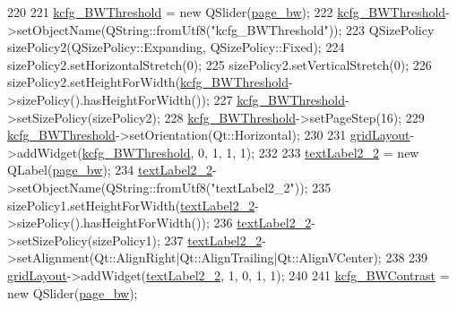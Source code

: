 \begin{DoxyCode}
220 
221         \hyperlink{classUi__DlgAccessibilityBase_a7be84a94ca25ab0c8bf269ef4fd69294}{kcfg\_BWThreshold} = \textcolor{keyword}{new} QSlider(\hyperlink{classUi__DlgAccessibilityBase_ad6248c8c27f576cedc9e49b6144c4bc4}{page\_bw});
222         \hyperlink{classUi__DlgAccessibilityBase_a7be84a94ca25ab0c8bf269ef4fd69294}{kcfg\_BWThreshold}->setObjectName(QString::fromUtf8(\textcolor{stringliteral}{"kcfg\_BWThreshold"}));
223         QSizePolicy sizePolicy2(QSizePolicy::Expanding, QSizePolicy::Fixed);
224         sizePolicy2.setHorizontalStretch(0);
225         sizePolicy2.setVerticalStretch(0);
226         sizePolicy2.setHeightForWidth(\hyperlink{classUi__DlgAccessibilityBase_a7be84a94ca25ab0c8bf269ef4fd69294}{kcfg\_BWThreshold}->sizePolicy().hasHeightForWidth());
227         \hyperlink{classUi__DlgAccessibilityBase_a7be84a94ca25ab0c8bf269ef4fd69294}{kcfg\_BWThreshold}->setSizePolicy(sizePolicy2);
228         \hyperlink{classUi__DlgAccessibilityBase_a7be84a94ca25ab0c8bf269ef4fd69294}{kcfg\_BWThreshold}->setPageStep(16);
229         \hyperlink{classUi__DlgAccessibilityBase_a7be84a94ca25ab0c8bf269ef4fd69294}{kcfg\_BWThreshold}->setOrientation(Qt::Horizontal);
230 
231         \hyperlink{classUi__DlgAccessibilityBase_a5f8944bbf69c844201c6fbfc3436c89b}{gridLayout}->addWidget(\hyperlink{classUi__DlgAccessibilityBase_a7be84a94ca25ab0c8bf269ef4fd69294}{kcfg\_BWThreshold}, 0, 1, 1, 1);
232 
233         \hyperlink{classUi__DlgAccessibilityBase_a2994502da41dffae4e1691734c4c352b}{textLabel2\_2} = \textcolor{keyword}{new} QLabel(\hyperlink{classUi__DlgAccessibilityBase_ad6248c8c27f576cedc9e49b6144c4bc4}{page\_bw});
234         \hyperlink{classUi__DlgAccessibilityBase_a2994502da41dffae4e1691734c4c352b}{textLabel2\_2}->setObjectName(QString::fromUtf8(\textcolor{stringliteral}{"textLabel2\_2"}));
235         sizePolicy1.setHeightForWidth(\hyperlink{classUi__DlgAccessibilityBase_a2994502da41dffae4e1691734c4c352b}{textLabel2\_2}->sizePolicy().hasHeightForWidth());
236         \hyperlink{classUi__DlgAccessibilityBase_a2994502da41dffae4e1691734c4c352b}{textLabel2\_2}->setSizePolicy(sizePolicy1);
237         \hyperlink{classUi__DlgAccessibilityBase_a2994502da41dffae4e1691734c4c352b}{textLabel2\_2}->setAlignment(Qt::AlignRight|Qt::AlignTrailing|Qt::AlignVCenter);
238 
239         \hyperlink{classUi__DlgAccessibilityBase_a5f8944bbf69c844201c6fbfc3436c89b}{gridLayout}->addWidget(\hyperlink{classUi__DlgAccessibilityBase_a2994502da41dffae4e1691734c4c352b}{textLabel2\_2}, 1, 0, 1, 1);
240 
241         \hyperlink{classUi__DlgAccessibilityBase_a4b034ff4228747708c7eeba77bc58734}{kcfg\_BWContrast} = \textcolor{keyword}{new} QSlider(\hyperlink{classUi__DlgAccessibilityBase_ad6248c8c27f576cedc9e49b6144c4bc4}{page\_bw});

\end{DoxyCode}
